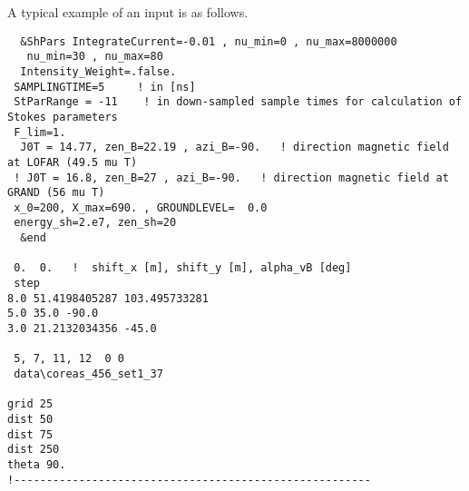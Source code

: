 
A typical example of an input is as follows.

\begin{linenumbers}
\begin{verbatim}
  &ShPars IntegrateCurrent=-0.01 , nu_min=0 , nu_max=8000000
   nu_min=30 , nu_max=80
  Intensity_Weight=.false.
 SAMPLINGTIME=5     ! in [ns]
 StParRange = -11    ! in down-sampled sample times for calculation of Stokes parameters
 F_lim=1.
  J0T = 14.77, zen_B=22.19 , azi_B=-90.   ! direction magnetic field at LOFAR (49.5 mu T)
 ! J0T = 16.8, zen_B=27 , azi_B=-90.   ! direction magnetic field at GRAND (56 mu T)
 x_0=200, X_max=690. , GROUNDLEVEL=  0.0
 energy_sh=2.e7, zen_sh=20
  &end

 0.  0.   !  shift_x [m], shift_y [m], alpha_vB [deg]
 step
8.0 51.4198405287 103.495733281
5.0 35.0 -90.0
3.0 21.2132034356 -45.0

 5, 7, 11, 12  0 0
 data\coreas_456_set1_37

grid 25
dist 50
dist 75
dist 250
theta 90.
!-------------------------------------------------------
\end{verbatim}
\end{linenumbers}
